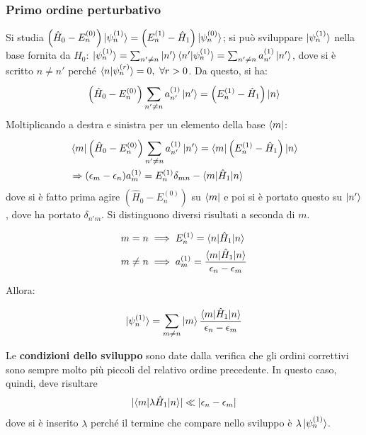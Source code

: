 \documentclass[11pt, a4paper]{scrartcl} %
\numberwithin{equation}{subsection}
\theoremstyle{style2}
\theoremstyle{style1}
\newenvironment{boxenv}[1][]{
    \begin{eqbox}[#1]
    }{
   \end{eqbox}
}
\begin{document}
\subsubsection{Primo ordine perturbativo}
Si studia $\left(\hat{H}_0 - E^{(0)}_n \right) \ket{\psi ^{(1)} _n} = \left(E^{(1)} _n - \hat{H}_1\right) \ket{\psi ^{(0)} _n} $; si pu\`o sviluppare $\ket{\psi ^{(1)} _n} $ nella base fornita da $\hat{H}_0$: $\ket{\psi ^{(1)} _n}  = \sum_{n'\neq n}^{} \ket{n'} \braket{n'|\psi ^{(1)} _n} = \sum_{n'\neq n}^{} a^{(1)} _{n'} \ket{n'} $, dove si \`e scritto $n\neq n'$ perch\'e $\braket{n|\psi ^{(r)} _n} = 0, \ \forall r > 0$. 
Da questo, si ha:
\[
\left(\hat{H}_0-E_n^{(0)} \right) \sum_{n'\neq n}^{} a^{(1)} _{n'} \ket{n'} = \left(E_n^{(1)} - \hat{H}_1\right) \ket{n} 
\] 
Moltiplicando a destra e sinistra per un elemento della base $\bra{m}  $:
\[
	\begin{split}
		&\bra{m} \left(\hat{H}_0-E_n^{(0)} \right) \sum_{n'\neq n}^{} a^{(1)} _{n'} \ket{n'} =\bra{m}  \left(E_n^{(1)} - \hat{H}_1\right) \ket{n} \\
		&\Rightarrow (\epsilon _m-\epsilon _n) a^{(1)} _m = E_n^{(1)} \delta _{mn} - \braket{m|\hat{H}_1|n}  
	\end{split}
\] 
dove si \`e fatto prima agire $(\hat{H}_0 - E^{(0)}_n )$ su $\bra{m} $ e poi si \`e portato questo su $\ket{n'} $, dove ha portato $\delta _{n'm} $.
Si distinguono diversi risultati a seconda di $m$.
\begin{boxenv}[]
\begin{equation}
	\begin{split}
		&m=n \implies E^{(1)} _n = \braket{n|\hat{H}_1|n} \\
		&m\neq n \implies a_m^{(1)} = \frac{\braket{m|\hat{H}_1|n} }{\epsilon _n - \epsilon _m}
	\end{split}
\end{equation}
\end{boxenv}
\noindent Allora:
\begin{boxenv}[]
\begin{equation}
	\ket{\psi ^{(1)} _n} = \sum_{m\neq n}^{} \ket{m} \frac{\braket{m|\hat{H}_1|n} }{\epsilon _n- \epsilon _m}
\end{equation}
\end{boxenv}
Le \textbf{condizioni dello sviluppo} sono date dalla verifica che gli ordini correttivi sono sempre molto pi\`u piccoli del relativo ordine precedente.
In questo caso, quindi, deve risultare
\[
\lvert \braket{m|\lambda \hat{H}_1|n}  \rvert \ll \lvert \epsilon _n -\epsilon _m \rvert 
\] 
dove si \`e inserito $\lambda $ perch\'e il termine che compare nello sviluppo \`e $\lambda \ket{\psi ^{(1)} _n} $.
\end{document}
